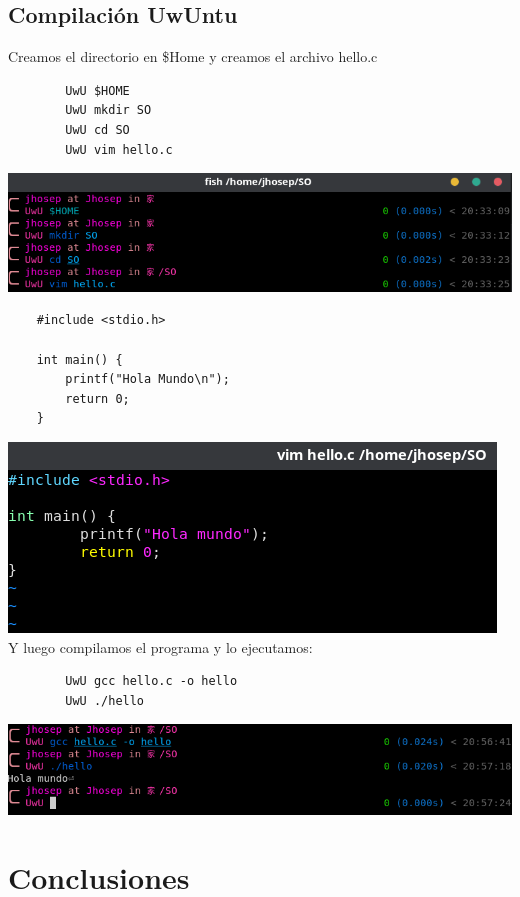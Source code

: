 \documentclass{article}
\begin{document}
\newpage

   \subsection{Compilación UwUntu}
Creamos el directorio en \$Home y creamos el archivo hello.c
    \begin{verbatim}
        UwU $HOME
        UwU mkdir SO
        UwU cd SO
        UwU vim hello.c
    \end{verbatim}
\includegraphics[scale=0.6]{Uwuntu/CreacionHelloc.png}
\\
    \begin{verbatim}
    #include <stdio.h>

    int main() {
        printf("Hola Mundo\n");
        return 0;
    }
    \end{verbatim}
\includegraphics[scale=1.2]{Uwuntu/Holamundo.png}
\\
Y luego compilamos el programa y lo ejecutamos:
    \begin{verbatim}
        UwU gcc hello.c -o hello
        UwU ./hello
    \end{verbatim}
\includegraphics[scale=0.6]{Uwuntu/Ejecucionhelloc.png}
\\

\section{Conclusiones}
\end{document}
